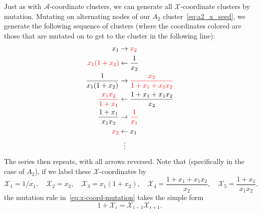 \documentclass[11pt]{article}
\def\nl{\nonumber\\}
\def\nn{\nonumber}
\def\x{\mathcal{X}}
\def\a{\mathcal{A}}
\def\drawPentagon{
\coordinate (P1) at (90:1);
\coordinate (P2) at (18:1);
\coordinate (P3) at (306:1);
\coordinate (P4) at (234:1);
\coordinate (P5) at (162:1);
\draw (P1) -- (P2) -- (P3) -- (P4) -- (P5) -- cycle;
}
\begin{document}
Just as with $\a$-coordinate clusters, we can generate all $\x$-coordinate clusters by mutation. Mutating on alternating nodes of our $A_2$ cluster~\eqref{eq:a2_x_seed}, we generate the following sequence of clusters (where the coordinates colored \mbox{\color{red}{red}} are those that are mutated on to get to the cluster in the following line):
\begin{align}
  x_1 &\to \color{red}{x_2} \nl
  \color{red}{x_1(1+x_2)} &\leftarrow \frac{1}{x_2} \nl
  \frac{1}{x_1(1+x_2)} &\to \color{red}{\frac{x_2}{1+x_1+x_1 x_2}} \\
  \color{red}{\frac{x_1 x_2}{1+x_1}} &\leftarrow \frac{1+x_1+x_1 x_2}{x_2} \nl
  \frac{1+x_1}{x_1 x_2} &\to \color{red}{\frac{1}{x_1}} \nl
  \color{red}{x_2} &\leftarrow x_1 \nl
  &\ \ \vdots \nn
\end{align}
The series then repeats, with all arrows reversed. Note that (specifically in the case of $A_2$), if we label these $\x$-coordinates by
\begin{equation}\label{def:a2-xcoords}
  \x_1 = 1/x_1, \quad \x_2 = x_2, \quad \x_3 = x_1(1+x_2), \quad 
  \x_4 = \frac{1+x_1+x_1 x_2}{x_2}, \quad \x_5 = \frac{1+x_1}{x_1 x_2},
\end{equation}
the mutation rule in~\eqref{eq:x-coord-mutation} takes the simple form
\begin{equation}\label{eq:exchange-relation}
  1+\x_i = \x_{i-1}\x_{i+1}.
\end{equation}
\end{document}
